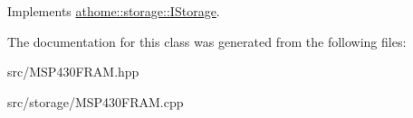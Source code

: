 Implements \mbox{\hyperlink{classathome_1_1storage_1_1_i_storage_a1017bb6ad438313b98197893954e52f1}{athome\+::storage\+::\+I\+Storage}}.



The documentation for this class was generated from the following files\+:\begin{DoxyCompactItemize}
\item 
src/M\+S\+P430\+F\+R\+A\+M.\+hpp\item 
src/storage/M\+S\+P430\+F\+R\+A\+M.\+cpp\end{DoxyCompactItemize}
